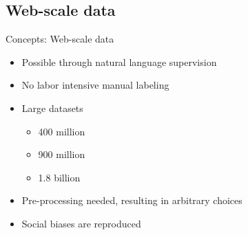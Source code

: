 \documentclass[xcolor=dvipsnames]{beamer}
\begin{document}
\subsection{Web-scale data} %
\begin{frame}{Concepts: Web-scale data}
  \begin{itemize}
    \item Possible through natural language supervision
    \item No labor intensive manual labeling
    \item Large datasets
      \begin{itemize}
        \item 400 million \parencite[CLIP;][]{radford2021learning}
        \item 900 million \parencite[Florence;][]{yuan2021florence}
        \item 1.8 billion \parencite[ALIGN;][]{jia2021scaling}
      \end{itemize}
    \item Pre-processing needed, resulting in arbitrary choices
    \item Social biases are reproduced
  \end{itemize}
\end{frame}
\end{document}
